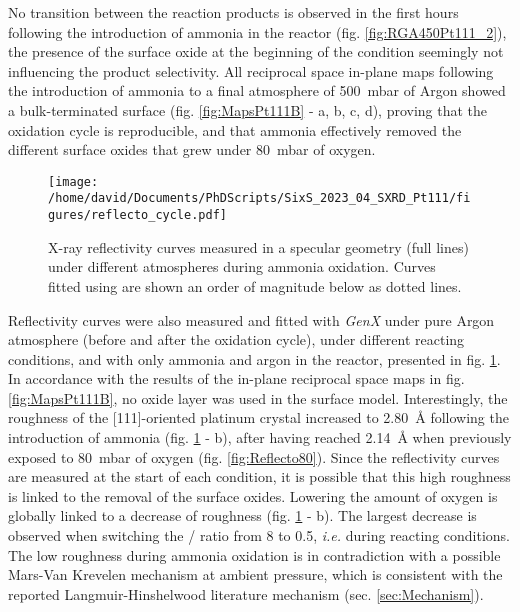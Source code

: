 No transition between the reaction products is observed in the first hours following the introduction of ammonia in the reactor (fig. \ref{fig:RGA450Pt111_2}), the presence of the surface oxide at the beginning of the condition seemingly not influencing the product selectivity.
All reciprocal space in-plane maps following the introduction of ammonia to a final atmosphere of \qty{500}{\milli\bar} of Argon showed a bulk-terminated surface (fig. \ref{fig:MapsPt111B} - a, b, c, d), proving that the oxidation cycle is reproducible, and that ammonia effectively removed the different surface oxides that grew under \qty{80}{\milli\bar} of oxygen.

\begin{figure}[!htb]
    \centering
    \texttt{[image: /home/david/Documents/PhDScripts/SixS\_2023\_04\_SXRD\_Pt111/figures/reflecto\_cycle.pdf]}
    \caption{
    	X-ray reflectivity curves measured in a specular geometry (full lines) under different atmospheres during ammonia oxidation.
    	Curves fitted using  are shown an order of magnitude below as dotted lines.
    }
    \label{fig:ReflectoCycle}
\end{figure}

Reflectivity curves were also measured and fitted with \textit{GenX} under pure Argon atmosphere (before and after the oxidation cycle), under different reacting conditions, and with only ammonia and argon in the reactor, presented in fig. \ref{fig:ReflectoCycle}.
In accordance with the results of the in-plane reciprocal space maps in fig. \ref{fig:MapsPt111B}, no oxide layer was used in the surface model.
Interestingly, the roughness of the [111]-oriented platinum crystal increased to \qty{2.80}{\angstrom} following the introduction of ammonia (fig. \ref{fig:ReflectoCycle} - b), after having reached \qty{2.14}{\angstrom} when previously exposed to \qty{80}{\milli\bar} of oxygen (fig. \ref{fig:Reflecto80}).
Since the reflectivity curves are measured at the start of each condition, it is possible that this high roughness is linked to the removal of the surface oxides.
Lowering the amount of oxygen is globally linked to a decrease of roughness (fig. \ref{fig:ReflectoCycle} - b).
The largest decrease is observed when switching the / ratio from 8 to 0.5, \textit{i.e.} during reacting conditions.
The low roughness during ammonia oxidation is in contradiction with a possible Mars-Van Krevelen mechanism at ambient pressure, which is consistent with the reported Langmuir-Hinshelwood literature mechanism (sec. \ref{sec:Mechanism}).

